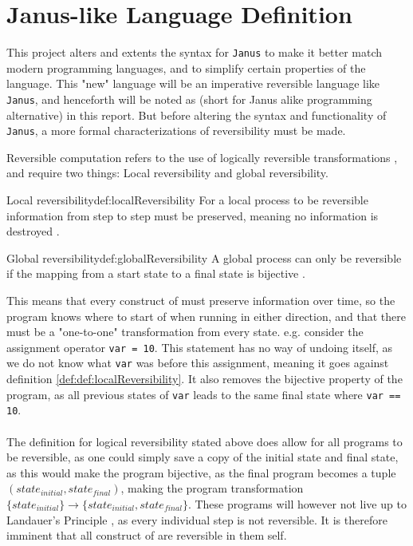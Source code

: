 \section{Janus-like Language Definition \rr} \label{sec:language-def}

This project alters and extents the syntax for \texttt{Janus} to make it better match modern
programming languages, and to simplify certain properties of the language.
This "new" language will be an imperative reversible language like
\texttt{Janus}, and henceforth will be noted as \lan
(short for Janus alike programming alternative) in this report.
But before altering the syntax and functionality of \texttt{Janus}, a more formal characterizations
of reversibility must be made.

Reversible computation refers to the use of logically reversible transformations \cite{ARTICLE:2},
and require two things: Local reversibility and global reversibility.

\begin{myDefinition}{Local reversibility}{def:localReversibility}
For a local process to be reversible information from step to step must be preserved, meaning no
information is destroyed \cite{ARTICLE:1}.
\end{myDefinition}

\begin{myDefinition}{Global reversibility}{def:globalReversibility}
A global process can only be reversible if the mapping from a start state to a final state is
bijective \cite{ARTICLE:1}. 
\end{myDefinition}
\noindent
This means that every construct of \lan must preserve information over time, so the program
knows where to start of when running in either direction, and that there must be a "one-to-one"
transformation from every state. e.g. consider the assignment operator \texttt{var = 10}. This
statement has no way of undoing itself, as we do not know what \texttt{var} was before this
assignment, meaning it goes against definition \ref{def:def:localReversibility}. It also removes
the bijective property of the program, as all previous states of \texttt{var} leads to the same
final state where \texttt{var == 10}.
\\
\\
The definition for logical reversibility stated above does allow for all programs to be reversible,
as one could simply save a copy of the initial state and final state, as this would make
the program bijective, as the final program becomes a tuple $(state_{initial}, state_{final})$,
making the program transformation $\{state_{initial}\} \to \{state_{initial}, state_{final}\}$.
These programs will however not live up to Landauer's Principle \cite{article:3}, as every
individual step is not reversible. It is therefore imminent that all construct of \lan are
reversible in them self.

